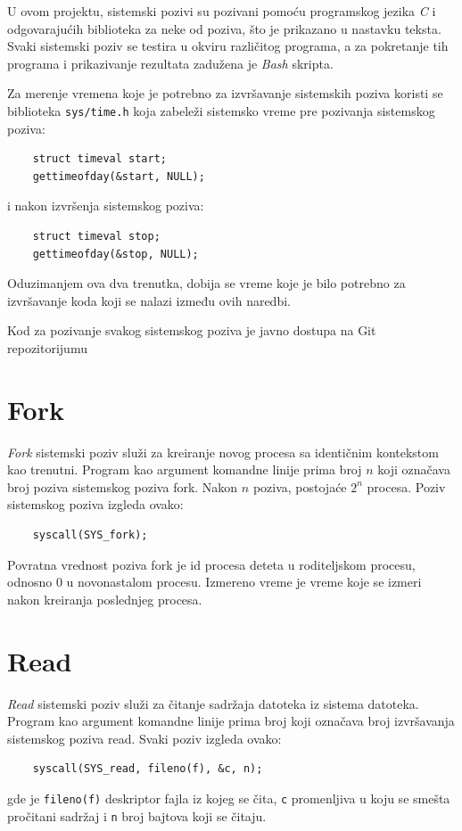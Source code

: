 \documentclass[12pt]{report}
\begin{document}
U ovom projektu, sistemski pozivi su pozivani pomoću programskog jezika \textit{C} i odgovarajućih biblioteka za neke od poziva, što je prikazano u nastavku teksta. Svaki sistemski poziv se testira u okviru različitog programa, a za pokretanje tih programa i prikazivanje rezultata zadužena je \textit{Bash} skripta.

Za merenje vremena koje je potrebno za izvršavanje sistemskih poziva koristi se biblioteka \texttt{sys/time.h} koja zabeleži sistemsko vreme pre pozivanja sistemskog poziva:
\begin{verbatim}
    struct timeval start;
    gettimeofday(&start, NULL);
\end{verbatim}
i nakon izvršenja sistemskog poziva:
\begin{verbatim}
    struct timeval stop;
    gettimeofday(&stop, NULL);
\end{verbatim}

Oduzimanjem ova dva trenutka, dobija se vreme koje je bilo potrebno za izvršavanje koda koji se nalazi između ovih naredbi.

Kod za pozivanje svakog sistemskog poziva je javno dostupa na Git repozitorijumu~\cite{repo:syscalls}

\section{Fork}
\textit{Fork} sistemski poziv služi za kreiranje novog procesa sa identičnim kontekstom kao trenutni. Program kao argument komandne linije prima broj $ n $ koji označava broj poziva sistemskog poziva fork. Nakon $ n $ poziva, postojaće $ 2^n $ procesa. Poziv sistemskog poziva izgleda ovako:
\begin{verbatim}
    syscall(SYS_fork);
\end{verbatim}

Povratna vrednost poziva fork je id procesa deteta u roditeljskom procesu, odnosno 0 u novonastalom procesu. Izmereno vreme je vreme koje se izmeri nakon kreiranja poslednjeg procesa.

\section{Read}
\textit{Read} sistemski poziv služi za čitanje sadržaja datoteka iz sistema datoteka. Program kao argument komandne linije prima broj koji označava broj izvršavanja sistemskog poziva read. Svaki poziv izgleda ovako:
\begin{verbatim}
    syscall(SYS_read, fileno(f), &c, n);
\end{verbatim}
gde je \texttt{fileno(f)} deskriptor fajla iz kojeg se čita, \texttt{c} promenljiva u koju se smešta pročitani sadržaj i \texttt{n} broj bajtova koji se čitaju.
\end{document}
